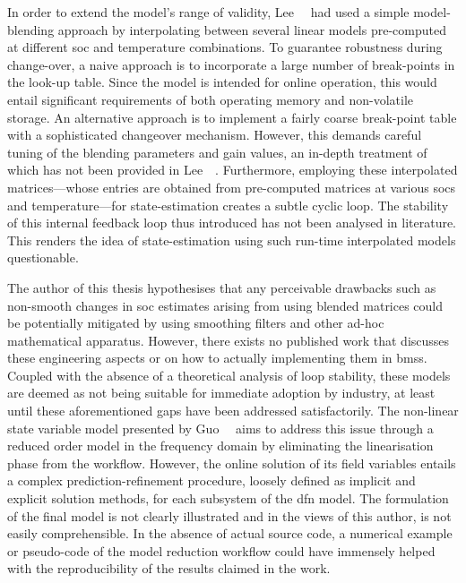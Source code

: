 In order to extend the model's range of validity, Lee~\etal{}~\cite{Lee2014} had
used a  simple model-blending approach  by interpolating between  several linear
models  pre-computed at  different  \gls{soc} and  temperature combinations.  To
guarantee robustness  during change-over, a  naive approach is to  incorporate a
large  number  of  break-points  in  the  look-up  table.  Since  the  model  is
intended  for  online  operation,  this would  entail  significant  requirements
of  both operating  memory  and non-volatile  storage.  An alternative  approach
is  to  implement  a  fairly  coarse  break-point  table  with  a  sophisticated
changeover  mechanism. However,  this  demands careful  tuning  of the  blending
parameters  and  gain values,  an  in-depth  treatment  of  which has  not  been
provided in Lee~\etal~\cite{Lee2014}.  Furthermore, employing these interpolated
matrices---whose  entries are  obtained  from pre-computed  matrices at  various
\glspl{soc} and temperature---for state-estimation creates a subtle cyclic loop.
The  stability of  this  internal feedback  loop thus  introduced  has not  been
analysed in  literature. This  renders the idea  of state-estimation  using such
run-time interpolated models questionable.


The  author of  this thesis  hypothesises  that any  perceivable drawbacks  such
as  non-smooth  changes  in  \gls{soc}  estimates  arising  from  using  blended
matrices could  be potentially  mitigated by using  smoothing filters  and other
ad-hoc  mathematical apparatus.  However, there  exists no  published work  that
discusses these engineering  aspects or on how to actually  implementing them in
\glspl{bms}.  Coupled  with  the  absence  of a  theoretical  analysis  of  loop
stability,  these  models  are  deemed  as  not  being  suitable  for  immediate
adoption  by  industry, at  least  until  these  aforementioned gaps  have  been
addressed  satisfactorily.  The non-linear  state  variable  model presented  by
Guo~\etal{}~\cite{Guo2017} aims  to address this  issue through a  reduced order
model in  the frequency domain by  eliminating the linearisation phase  from the
workflow. However, the online solution of  its field variables entails a complex
prediction-refinement  procedure,  loosely  defined  as  implicit  and  explicit
solution methods, for each subsystem of  the \gls{dfn} model. The formulation of
the final model is  not clearly illustrated and in the views  of this author, is
not easily  comprehensible. In the  absence of  actual source code,  a numerical
example  or pseudo-code  of the  model reduction  workflow could  have immensely
helped with the reproducibility of the results claimed in the work.

